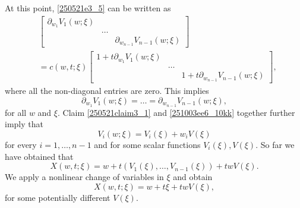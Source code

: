 \documentclass{article}
\numberwithin{equation}{section}
\theoremstyle{plain}
\begin{document}
At this point, \eqref{250521e3_5} can be written as 
\begin{align}\label{250521e3_8}
&
\begin{bmatrix}
\partial_{w_1} V_1(w; \xi) &  & \\
& \dots & \\
&  & \partial_{w_{n-1}} V_{n-1}(w; \xi)
\end{bmatrix}
\\
&
=c(w, t; \xi) 
\begin{bmatrix}
1+
t\partial_{w_1} V_1(w; \xi) & & \\
& \dots & \\
& & 1+t\partial_{w_{n-1}} V_{n-1}(w; \xi)
\end{bmatrix},
\end{align}
where all the non-diagonal entries are zero. 
This implies 
\begin{equation}\label{251003ee6_10kk}
\partial_{w_1} V_1(w; \xi)=\dots= \partial_{w_{n-1}} V_{n-1}(w; \xi),
\end{equation}
for all $w$ and $\xi$. 
Claim \ref{250521claim3_1} and \eqref{251003ee6_10kk} together 
 further imply that 
\begin{equation}
V_i(w; \xi)= V_{i}(\xi)+ w_i V(\xi)
\end{equation}
for every $i=1, \dots, n-1$ and for some scalar functions $V_i(\xi), V(\xi)$. 
So far we have obtained that  
\begin{equation}
X(w, t; \xi)= 
w+ t (V_1(\xi), \dots, V_{n-1}(\xi))+ 
tw V(\xi). 
\end{equation}
We apply a nonlinear change of variables in $\xi$ and obtain 
\begin{equation}
X(w, t; \xi)= 
w+ t\xi+ twV(\xi),
\end{equation}
for some potentially different $V(\xi)$. \\
\end{document}
